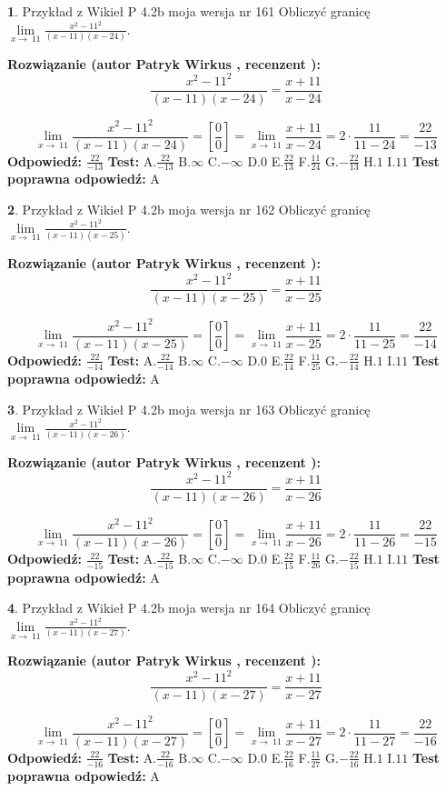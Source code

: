 \documentclass[12pt, a4paper]{article}
\theoremstyle{definition} %
\newtheorem{zad}{}
\newcommand{\zadStart}[1]{\begin{zad}#1\newline}
\newcommand{\zadStop}{\end{zad}}
\newcommand{\rozwStart}[2]{\noindent \textbf{Rozwiązanie (autor #1 , recenzent #2): }\newline}
\newcommand{\rozwStop}{\newline}
\newcommand{\odpStart}{\noindent \textbf{Odpowiedź:}\newline}
\newcommand{\odpStop}{\newline}
\newcommand{\testStart}{\noindent \textbf{Test:}\newline}
\newcommand{\testStop}{\newline}
\newcommand{\kluczStart}{\noindent \textbf{Test poprawna odpowiedź:}\newline}
\newcommand{\kluczStop}{\newline}
\begin{document}
\zadStart{Przykład z Wikieł P 4.2b moja wersja nr 161}
Obliczyć granicę $\lim\limits_{x\to\ 11}\frac{x^{2}-11^{2}}{(x-11)(x-24)}$.
\zadStop
\rozwStart{Patryk Wirkus}{}
$$\frac{x^{2}-11^{2}}{(x-11)(x-24)}=\frac{x+11}{x-24}$$

$$\lim\limits_{x\to\ 11}\frac{x^{2}-11^{2}}{(x-11)(x-24)}=[\frac{0}{0}]=\lim\limits_{x\to\ 11}\frac{x+11}{x-24}=2 \cdot \frac{11}{11-24} = \frac{22}{-13}$$
\rozwStop
\odpStart
$\frac{22}{-13}$
\odpStop
\testStart
A.$\frac{22}{-13}$
B.$\infty$
C.$-\infty$
D.$0$
E.$\frac{22}{13}$
F.$\frac{11}{24}$
G.$-\frac{22}{13}$
H.$1$
I.$11$
\testStop
\kluczStart
A
\kluczStop



\zadStart{Przykład z Wikieł P 4.2b moja wersja nr 162}
Obliczyć granicę $\lim\limits_{x\to\ 11}\frac{x^{2}-11^{2}}{(x-11)(x-25)}$.
\zadStop
\rozwStart{Patryk Wirkus}{}
$$\frac{x^{2}-11^{2}}{(x-11)(x-25)}=\frac{x+11}{x-25}$$

$$\lim\limits_{x\to\ 11}\frac{x^{2}-11^{2}}{(x-11)(x-25)}=[\frac{0}{0}]=\lim\limits_{x\to\ 11}\frac{x+11}{x-25}=2 \cdot \frac{11}{11-25} = \frac{22}{-14}$$
\rozwStop
\odpStart
$\frac{22}{-14}$
\odpStop
\testStart
A.$\frac{22}{-14}$
B.$\infty$
C.$-\infty$
D.$0$
E.$\frac{22}{14}$
F.$\frac{11}{25}$
G.$-\frac{22}{14}$
H.$1$
I.$11$
\testStop
\kluczStart
A
\kluczStop



\zadStart{Przykład z Wikieł P 4.2b moja wersja nr 163}
Obliczyć granicę $\lim\limits_{x\to\ 11}\frac{x^{2}-11^{2}}{(x-11)(x-26)}$.
\zadStop
\rozwStart{Patryk Wirkus}{}
$$\frac{x^{2}-11^{2}}{(x-11)(x-26)}=\frac{x+11}{x-26}$$

$$\lim\limits_{x\to\ 11}\frac{x^{2}-11^{2}}{(x-11)(x-26)}=[\frac{0}{0}]=\lim\limits_{x\to\ 11}\frac{x+11}{x-26}=2 \cdot \frac{11}{11-26} = \frac{22}{-15}$$
\rozwStop
\odpStart
$\frac{22}{-15}$
\odpStop
\testStart
A.$\frac{22}{-15}$
B.$\infty$
C.$-\infty$
D.$0$
E.$\frac{22}{15}$
F.$\frac{11}{26}$
G.$-\frac{22}{15}$
H.$1$
I.$11$
\testStop
\kluczStart
A
\kluczStop



\zadStart{Przykład z Wikieł P 4.2b moja wersja nr 164}
Obliczyć granicę $\lim\limits_{x\to\ 11}\frac{x^{2}-11^{2}}{(x-11)(x-27)}$.
\zadStop
\rozwStart{Patryk Wirkus}{}
$$\frac{x^{2}-11^{2}}{(x-11)(x-27)}=\frac{x+11}{x-27}$$

$$\lim\limits_{x\to\ 11}\frac{x^{2}-11^{2}}{(x-11)(x-27)}=[\frac{0}{0}]=\lim\limits_{x\to\ 11}\frac{x+11}{x-27}=2 \cdot \frac{11}{11-27} = \frac{22}{-16}$$
\rozwStop
\odpStart
$\frac{22}{-16}$
\odpStop
\testStart
A.$\frac{22}{-16}$
B.$\infty$
C.$-\infty$
D.$0$
E.$\frac{22}{16}$
F.$\frac{11}{27}$
G.$-\frac{22}{16}$
H.$1$
I.$11$
\testStop
\kluczStart
A
\kluczStop
\end{document}
